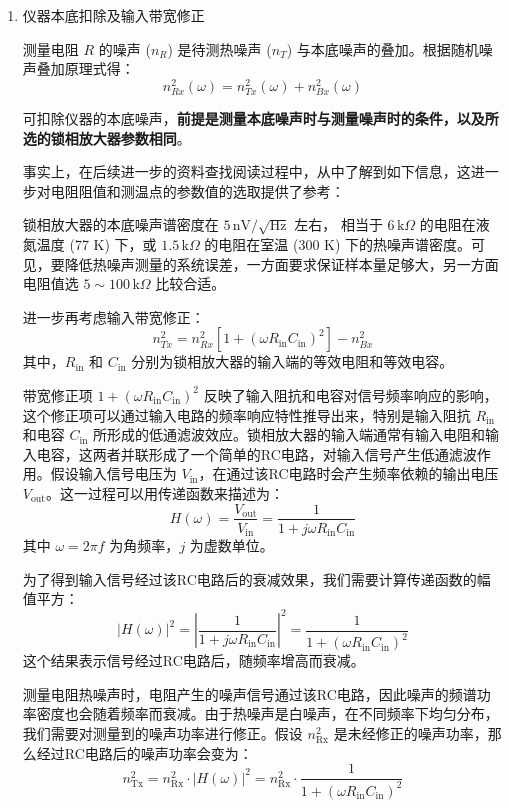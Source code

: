\documentclass[dvipsnames, svgnames,a4paper,11pt]{article}
\begin{document}
\begin{enumerate}
		\item 仪器本底扣除及输入带宽修正
		
		测量电阻 $R$ 的噪声 ($n_R$) 是待测热噪声 ($n_T$) 与本底噪声的叠加。根据随机噪声叠加原理式得：
		\[
		n_{Rx}^2(\omega) = n_{Tx}^2(\omega) + n_{Bx}^2(\omega)
		\]
		
		可扣除仪器的本底噪声，\textbf{前提是测量本底噪声时与测量噪声时的条件，以及所选的锁相放大器参数相同}。
		
		事实上，在后续进一步的资料查找阅读过程中，从\cite{g}中了解到如下信息，这进一步对电阻阻值和测温点的参数值的选取提供了参考：
		
		锁相放大器的本底噪声谱密度在 $5 \, \text{nV}/\sqrt{\text{Hz}}$ 左右， 相当于 $6 \, \text{k}\Omega$ 的电阻在液氮温度 (77 K) 下，或 $1.5 \, \text{k}\Omega$ 的电阻在室温 (300 K) 下的热噪声谱密度。可见，要降低热噪声测量的系统误差，一方面要求保证样本量足够大，另一方面电阻值选 $5 \sim 100 \, \text{k}\Omega$ 比较合适。
		
		进一步再考虑输入带宽修正：
		\[
		n_{Tx}^2 = n_{Rx}^2 \left[ 1 + (\omega R_{\text{in}} C_{\text{in}})^2 \right] - n_{Bx}^2
		\]
		其中，$R_{\text{in}}$ 和 $C_{\text{in}}$ 分别为锁相放大器的输入端的等效电阻和等效电容。
		
		带宽修正项 \(1 + (\omega R_{\text{in}}C_{\text{in}})^2\) 反映了输入阻抗和电容对信号频率响应的影响，这个修正项可以通过输入电路的频率响应特性推导出来，特别是输入阻抗 \( R_{\text{in}} \) 和电容 \( C_{\text{in}} \) 所形成的低通滤波效应。锁相放大器的输入端通常有输入电阻和输入电容，这两者并联形成了一个简单的RC电路，对输入信号产生低通滤波作用。假设输入信号电压为 \( V_{\text{in}} \)，在通过该RC电路时会产生频率依赖的输出电压 \( V_{\text{out}} \)。这一过程可以用传递函数来描述为：
		\[
		H(\omega) = \frac{V_{\text{out}}}{V_{\text{in}}} = \frac{1}{1 + j\omega R_{\text{in}} C_{\text{in}}}
		\]
		其中 \( \omega = 2\pi f \) 为角频率，\( j \) 为虚数单位。
		
		为了得到输入信号经过该RC电路后的衰减效果，我们需要计算传递函数的幅值平方：
		\[
		|H(\omega)|^2 = \left| \frac{1}{1 + j\omega R_{\text{in}} C_{\text{in}}} \right|^2 = \frac{1}{1 + (\omega R_{\text{in}} C_{\text{in}})^2}
		\]
		这个结果表示信号经过RC电路后，随频率增高而衰减。
		
		测量电阻热噪声时，电阻产生的噪声信号通过该RC电路，因此噪声的频谱功率密度也会随着频率而衰减。由于热噪声是白噪声，在不同频率下均匀分布，我们需要对测量到的噪声功率进行修正。假设 \( n_{\text{Rx}}^2 \) 是未经修正的噪声功率，那么经过RC电路后的噪声功率会变为：
		\[
		n_{\text{Tx}}^2 = n_{\text{Rx}}^2 \cdot |H(\omega)|^2 = n_{\text{Rx}}^2 \cdot \frac{1}{1 + (\omega R_{\text{in}} C_{\text{in}})^2}
		\]
		

\end{enumerate}
\end{document}
